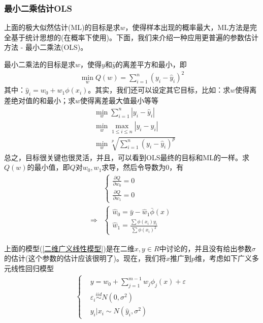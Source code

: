         \subsubsection{最小二乘估计OLS}
            \par
            上面的极大似然估计(ML)的目标是求$w$，使得样本出现的概率最大，ML方法是完全基于统计思想的(在概率下使用)。下面，我们来介绍一种应用更普遍的参数估计方法 - 最小二乘法(OLS)。
            \par
            最小二乘法的目标是求$w$，使得$y$和$\hat{y}$的离差平方和最小，即
            \begin{align}
              \label{线性回归的最小二乘优化目标}
            \min_w Q(w) = \sum_{i=1}^n(y_i-\hat{y}_i)^2
            \end{align}
            其中：$\hat{y}_i= w_0+w_1\phi(x_i)$。其实，我们还可以设定其它目标，比如：求$w$使得离差绝对值的和最小；求$w$使得离差最大值最小等等
            \begin{align*}
            &\min_w \sum_{i=1}^n |y_i-\hat{y}_i|\\
            &\min_w \max_{1\leqslant i \leqslant n} |y_i - \hat{y}_i|\\
            &\min_w \sqrt[p]{\sum_{i=1}^n(y_i - \hat{y}_i)^p}
            \end{align*}
            总之，目标很关键也很灵活，并且，可以看到OLS最终的目标和ML的一样。求$Q(w)$的最小值，即$Q$对$w_0,w_1$求导，然后令导数为0，有
            \begin{align*}
            &\left\{
            \begin{aligned}
            \frac{\partial Q}{\partial w_0} = 0\\
            \frac{\partial Q}{\partial w_1} = 0
            \end{aligned}
            \right.\\
            \Rightarrow {} &
            \left\{
            \begin{aligned}
            \hat{w}_0 = \bar{y} - \hat{w}_1\bar{\phi}(x)\\
            \hat{w}_1 = \frac{\sum \phi(x_i)y_i}{\sum \phi(x_i)^2}
            \end{aligned}
            \right.
            \end{align*}
            \par
            上面的模型(\ref{二维广义线性模型})是在二维$x,y\in R$中讨论的，并且没有给出参数$\sigma$的估计(这个参数的估计应该很明了)。现在，我们将$x$推广到$p$维，考虑如下广义多元线性回归模型
            \begin{align*}
            \left\{
            \begin{aligned}
            &y = w_0 + \sum_{j=1}^{m-1}w_j \phi_j(x) +\varepsilon \\
            &\varepsilon_i \overset{iid}{\sim} N(0,\sigma^2)\\
            &y_i|x_i\sim N(\hat{y}_i,\sigma^2)
            \end{aligned}
            \right.
            \end{align*}
